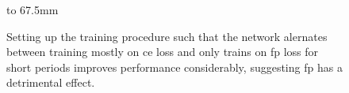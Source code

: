 \begin{figure}[p]
    \hbox to 67.5mm{}
    \caption[The results of the eighth training scheme]{Setting up the training procedure such that the network alernates between training mostly on \gls{ce} loss and only trains on \gls{fp} loss for short periods improves performance considerably, suggesting \gls{fp} has a detrimental effect.}
    \label{fig:training_scheme_8}
\end{figure}

\newpage


